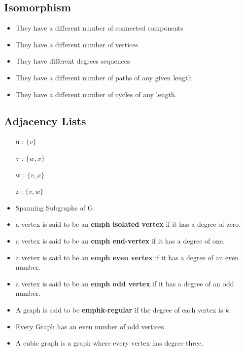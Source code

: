 \documentclass[]{report}
\begin{document}
\subsection*{Isomorphism}
\begin{itemize}
\item They have a different number of connected components
\item They have a different number of vertices
\item They have different degrees sequences
\item They have a different number of paths of any given length
\item They have a different number of cycles of any length.
\end{itemize}

\subsection*{Adjacency Lists}
\begin{itemize}
\item[u]: $\{v\}$
\item[v]: $\{w,x\}$
\item[w]: $\{v,x\}$
\item[z]: $\{v,w\}$
\end{itemize}




\begin{itemize}
\item Spanning Subgraphs of G.

\item a vertex is said to be an \textbf{emph{ isolated vertex}} if it has a degree of zero.
\item a vertex is said to be an \textbf{emph{ end-vertex}} if it has a degree of one.
\item a vertex is said to be an \textbf{emph{ even vertex}} if it has a degree of an even number.
\item a vertex is said to be an \textbf{emph{ odd vertex}} if it has a degree of an odd number.


\item A graph is said to be \textbf{emph{k-regular}} if the degree of each vertex is $k$. 
\item Every Graph has an even number of odd vertices.
\item A cubic graph is a graph where every vertex has degree three.
\end{itemize}
\end{document}
